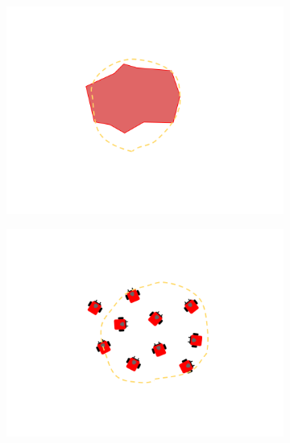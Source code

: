 \begin{figure}
	\centering
	\begin{subfigure}{0.48\textwidth}
		\includegraphics[width=\linewidth]{../Selection_Fuzz_X.png}
	\end{subfigure}
	\begin{subfigure}{0.48\textwidth}
		\includegraphics[width=\linewidth]{../Selection_Fuzz_10.png}
	\end{subfigure}
	\begin{subfigure}{0.48\textwidth}

\end{subfigure}
\end{figure}
